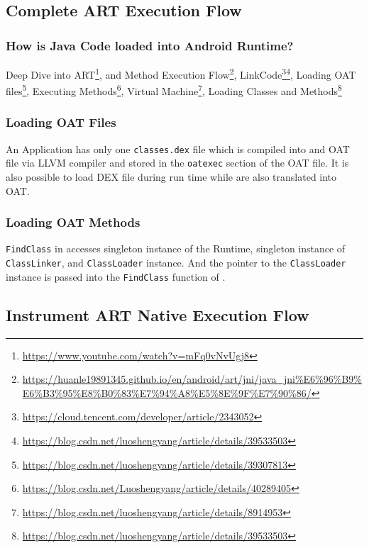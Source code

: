 \label{task:20240402_aosp}

\subsection{Complete ART Execution Flow}

\subsubsection{How is Java Code loaded into Android Runtime?}

Deep Dive into ART\footnote{\url{https://www.youtube.com/watch?v=mFq0vNvUgj8}}, and Method Execution Flow\footnote{\url{https://huanle19891345.github.io/en/android/art/jni/java_jni\%E6\%96\%B9\%E6\%B3\%95\%E8\%B0\%83\%E7\%94\%A8\%E5\%8E\%9F\%E7\%90\%86/}}, LinkCode\footnote{\url{https://cloud.tencent.com/developer/article/2343052}}\footnote{\url{https://blog.csdn.net/luoshengyang/article/details/39533503}}, Loading OAT files\footnote{\url{https://blog.csdn.net/luoshengyang/article/details/39307813}}, Executing Methods\footnote{\url{https://blog.csdn.net/Luoshengyang/article/details/40289405}}, Virtual Machine\footnote{\url{https://blog.csdn.net/luoshengyang/article/details/8914953}}, Loading Classes and Methods\footnote{\url{https://blog.csdn.net/luoshengyang/article/details/39533503}}

\subsubsection{Loading OAT Files}

An Application has only one \texttt{classes.dex} file which is compiled into and OAT file via LLVM compiler and stored in the \texttt{oatexec} section of the OAT file. It is also possible to load DEX file during run time while are also translated into OAT.

\subsubsection{Loading OAT Methods}

\texttt{FindClass} in  accesses singleton instance of the Runtime, singleton instance of \texttt{ClassLinker}, and \texttt{ClassLoader} instance. And the pointer to the \texttt{ClassLoader} instance is passed into the \texttt{FindClass} function of .

\subsection{Instrument ART Native Execution Flow}

